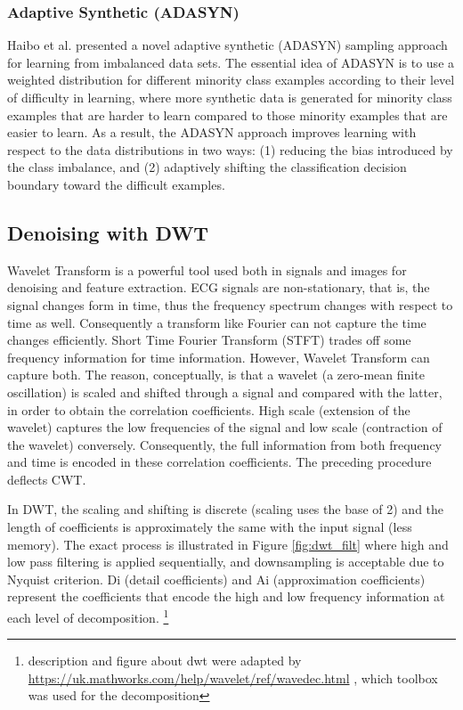\documentclass[a4paper,10pt,twocolumn]{article}
\begin{document}

\subsubsection{Adaptive Synthetic (ADASYN)}
Haibo et al. \cite{adasyn} presented a novel adaptive synthetic (ADASYN) sampling approach for learning from imbalanced data sets. The essential idea of ADASYN is to use a weighted distribution for different minority class examples according to their level of difficulty in learning, where more synthetic data is generated for minority class examples that are harder to learn compared to those minority examples that are easier to learn. As a result, the ADASYN approach improves learning with respect to the data distributions in two ways: (1) reducing the bias introduced by the class imbalance, and (2) adaptively shifting the classification decision boundary toward the difficult examples.


\subsection{Denoising with DWT}
\label{sec:4.2}
Wavelet Transform is a powerful tool used both in signals and images for denoising and feature extraction. ECG signals are non-stationary, that is, the signal changes form in time, thus the frequency spectrum changes with respect to time as well. Consequently a transform like Fourier can not capture the time changes efficiently. Short Time Fourier Transform (STFT) trades off some frequency information for time information. However, Wavelet Transform can capture both. The reason, conceptually, is that a wavelet (a zero-mean finite oscillation) is scaled and shifted through a signal and compared with the latter, in order to obtain the correlation coefficients. High scale (extension of the wavelet) captures the low frequencies of the signal and low scale (contraction of the wavelet) conversely. Consequently, the full information from both frequency and time is encoded in these correlation coefficients. The preceding procedure deflects CWT.

In DWT, the scaling and shifting is discrete (scaling uses the base of 2) and the length of coefficients is approximately the same with the input signal (less memory). The exact process is illustrated in Figure \ref{fig:dwt_filt} where high and low pass filtering is applied sequentially, and downsampling is acceptable due to Nyquist criterion. Di (detail coefficients) and Ai (approximation coefficients) represent the coefficients that encode the high and low frequency information at each level of decomposition. \footnote{description and figure about dwt were adapted by \url{https://uk.mathworks.com/help/wavelet/ref/wavedec.html} , which toolbox was used for the decomposition}
\end{document}
